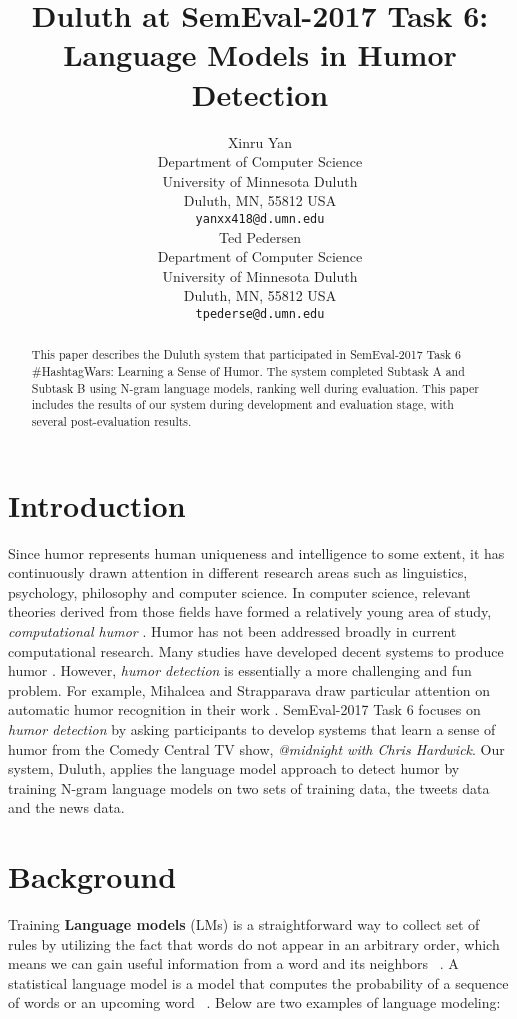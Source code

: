 \documentclass[11pt,a4paper]{article}
\title{Duluth at SemEval-2017 Task 6:  Language Models in Humor Detection}
\author{Xinru Yan \\
  Department of Computer Science \\ University of Minnesota Duluth \\ Duluth, MN, 55812 USA \\
  {\tt yanxx418@d.umn.edu} \\\And
  Ted Pedersen \\
  Department of Computer Science \\ University of Minnesota Duluth \\ Duluth, MN, 55812 USA \\
  {\tt tpederse@d.umn.edu} \\}
\date{}
\begin{document}
\maketitle
\begin{abstract}
  This paper describes the Duluth system that participated in SemEval-2017 Task 6 \#HashtagWars: Learning a Sense of Humor. The system completed Subtask A and Subtask B using N-gram language models, ranking well during evaluation. This paper includes the results of our system during development and evaluation stage, with several post-evaluation results. 
\end{abstract}

\section{Introduction}
Since humor represents human uniqueness and intelligence to some extent, it has continuously drawn attention in different research areas such as linguistics, psychology, philosophy and computer science. In computer science, relevant theories derived from those fields have formed a relatively young area of study, \textit{computational humor} \cite{Recognizing:Humor:On:Twitter}. Humor has not been addressed broadly in current computational research. Many studies have developed decent systems to produce humor \cite{ozbal2012computational}. However, \textit{humor detection} is essentially a more challenging and fun problem. For example, Mihalcea and Strapparava draw particular attention on automatic humor recognition in their work \cite{Learning:To:Laugh}. SemEval-2017 Task 6 focuses on \textit{humor detection} by asking participants to develop systems that learn a sense of humor from the Comedy Central TV show, \textit{@midnight with Chris Hardwick}. Our system, Duluth, applies the language model approach to detect humor by training N-gram language models on two sets of training data, the tweets data and the news data.


\section{Background}
Training \textbf{Language models} (LMs) is a straightforward way to collect set of rules by utilizing the fact that words do not appear in an arbitrary order, which means we can gain useful information from a word and its neighbors ~\cite{JM}. A statistical language model is a model that computes the probability of a sequence of words or an upcoming word ~\cite{JM}. Below are two examples of language modeling:
\end{document}
